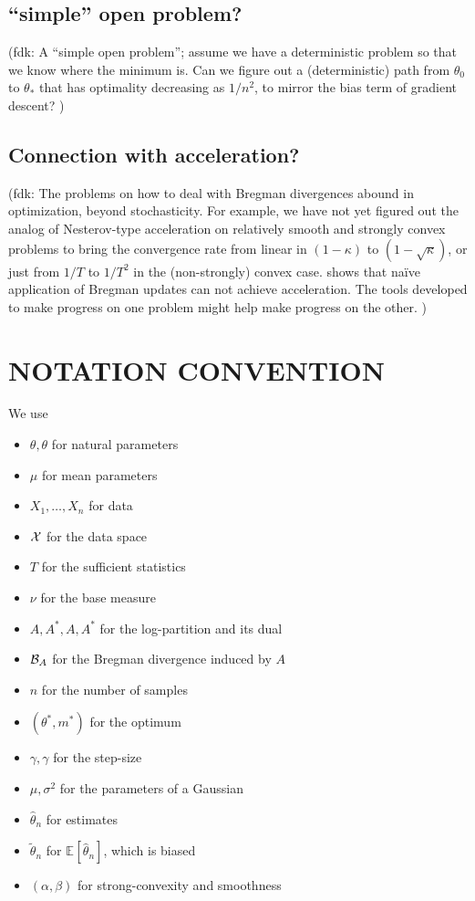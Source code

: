 \documentclass[twoside]{article}
\let\oldsection\section
\renewcommand{\section}[1]{\oldsection{\texorpdfstring{\uppercase{#1}}{#1}}}
\newcommand{\fdk}[1]{\textcolor{Periwinkle}{(fdk:#1)}}
\newcommand*{\expect}[2][]{\ensuremath{\mathbb{E}_{#1} \left[ #2 \right] }} %
\newcommand{\logpart}{A}
\newcommand{\conj}{\logpart^*}
\newcommand{\nat}{\theta}
\newcommand{\m}{\mu}
\newcommand{\lr}{\gamma} %
\newcommand{\stgcvx}{\alpha} %
\newcommand{\smooth}{\beta} %
\begin{document}
\subsection{``simple'' open problem?}
\fdk{
A ``simple open problem'';
assume we have a deterministic problem so that we know where the minimum is.
Can we figure out a (deterministic) path from $\theta_0$ to $\theta_*$
that has optimality decreasing as $1/n^2$,
to mirror the bias term of gradient descent?
}

\subsection{Connection with acceleration?}
\fdk{
The problems on how to deal with Bregman divergences abound in optimization, beyond stochasticity.
For example, we have not yet figured out the analog of Nesterov-type acceleration
on relatively smooth and strongly convex problems
to bring the convergence rate from linear in $(1-\kappa)$ to $(1-\sqrt{\kappa})$,
or just from $1/T$ to $1/T^2$ in the (non-strongly) convex case.
\citet{dragomir2021optimal}  shows that naïve application of Bregman updates can not achieve acceleration.
The tools developed to make progress on one problem might help make progress on the other.
}






\newpage
\section{Notation convention}
We use
\begin{itemize}
	\item $\theta, \nat$ for natural parameters
	\item $\m$ for mean parameters
	\item $X_1,\ldots,X_n$ for data
	\item ${\mathcal X}$ for the data space
	\item $T$ for the sufficient statistics
	\item $\nu$ for the base measure
	\item $A, A^*, \logpart, \conj$ for the log-partition and its dual
	\item ${\mathcal B}_A$ for the Bregman divergence induced by $A$
	\item $n$ for the number of samples
	\item $(\theta^*,m^*)$ for the optimum
	\item $\gamma, \lr$ for the step-size
	\item $\mu,\sigma^2$ for the parameters of a Gaussian
	\item $\hat\theta_n$ for estimates
	\item $\tilde\theta_n$ for $\expect{\hat\theta_n}$, which is biased
	\item $(\stgcvx , \smooth)$ for strong-convexity and smoothness
\end{itemize}

 
\end{document}

